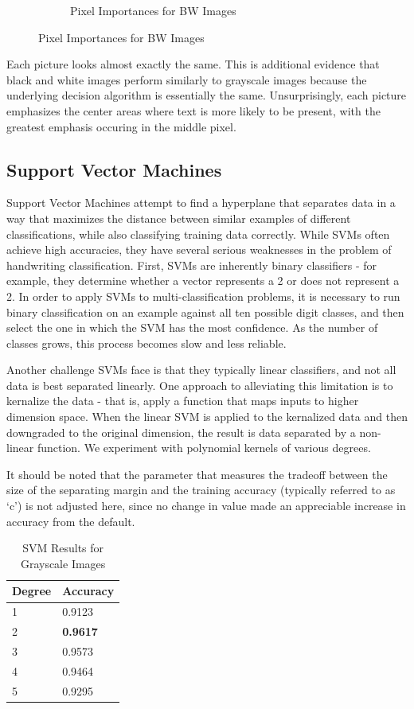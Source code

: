 \documentclass[12pt]{article}
\begin{document}
\begin{figure}[H]
\begin{subfigure}{.4\textwidth}
  \caption{Pixel Importances for BW Images}
  \label{fig:sub2}
\end{subfigure}
\end{figure}

Each picture looks almost exactly the same. This is additional evidence that black and white images perform similarly to grayscale images because the underlying decision algorithm is essentially the same. Unsurprisingly, each picture emphasizes the center areas where text is more likely to be present, with the greatest emphasis occuring in the middle pixel. 

\subsection*{Support Vector Machines}
Support Vector Machines attempt to find a hyperplane that separates data in a way that maximizes the distance between similar examples of different classifications, while also classifying training data correctly. While SVMs often achieve high accuracies, they have several serious weaknesses in the problem of handwriting classification. First, SVMs are inherently binary classifiers - for example, they determine whether a vector represents a 2 or does not represent a 2. In order to apply SVMs to multi-classification problems, it is necessary to run binary classification on an example against all ten possible digit classes, and then select the one in which the SVM has the most confidence. As the number of classes grows, this process becomes slow and less reliable. 

Another challenge SVMs face is that they typically linear classifiers, and not all data is best separated linearly. One approach to alleviating this limitation is to kernalize the data - that is, apply a function that maps inputs to higher dimension space. When the linear SVM is applied to the kernalized data and then downgraded to the original dimension, the result is data separated by a non-linear function. We experiment with polynomial kernels of various degrees. 

It should be noted that the parameter that measures the tradeoff between the size of the separating margin and the training accuracy (typically referred to as ‘c’) is not adjusted here, since no change in value made an appreciable increase in accuracy from the default.

\begin{table}[ht!]
\centering
\caption{SVM Results for Grayscale Images}
    \begin{tabular}{|l|l|}
    \hline
    Degree & Accuracy \\ \hline
    1      & 0.9123   \\ \hline
    2      & \textbf{0.9617}   \\ \hline
    3      & 0.9573   \\ \hline
    4      & 0.9464   \\ \hline
    5      & 0.9295   \\ \hline
    \end{tabular}
\end{table}
\end{document}
